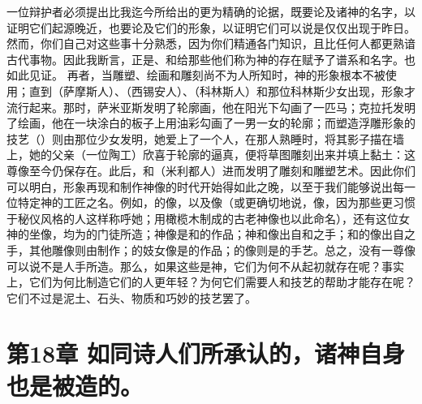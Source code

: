 一位辩护者必须提出比我迄今所给出的更为精确的论据，既要论及诸神的名字，以证明它们起源晚近，也要论及它们的形象，以证明它们可以说是仅仅出现于昨日。然而，你们自己对这些事十分熟悉，因为你们精通各门知识，且比任何人都更熟谙古代事物。因此我断言，正是、和给那些他们称为神的存在赋予了谱系和名字。也如此见证。 再者，当雕塑、绘画和雕刻尚不为人所知时，神的形象根本不被使用；直到（萨摩斯人）、（西锡安人）、（科林斯人）和那位科林斯少女出现，形象才流行起来。那时，萨米亚斯发明了轮廓画，他在阳光下勾画了一匹马；克拉托发明了绘画，他在一块涂白的板子上用油彩勾画了一男一女的轮廓；而塑造浮雕形象的技艺（）则由那位少女发明，她爱上了一个人，在那人熟睡时，将其影子描在墙上，她的父亲（一位陶工）欣喜于轮廓的逼真，便将草图雕刻出来并填上黏土：这尊像至今仍保存在。此后，和（米利都人）进而发明了雕刻和雕塑艺术。因此你们可以明白，形象再现和制作神像的时代开始得如此之晚，以至于我们能够说出每一位特定神的工匠之名。例如，的像，以及像（或更确切地说，像，因为那些更习惯于秘仪风格的人这样称呼她；用橄榄木制成的古老神像也以此命名），还有这位女神的坐像，均为的门徒所造；神像是和的作品；神和像出自和之手；和的像出自之手，其他雕像则由制作；的妓女像是的作品；的像则是的手艺。总之，没有一尊像可以说不是人手所造。那么，如果这些是神，它们为何不从起初就存在呢？事实上，它们为何比制造它们的人更年轻？为何它们需要人和技艺的帮助才能存在呢？它们不过是泥土、石头、物质和巧妙的技艺罢了。\par


\section{第18章 如同诗人们所承认的，诸神自身也是被造的。}

